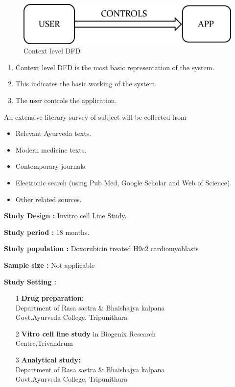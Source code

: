 \documentclass[11pt]{report} %
\begin{document}
\begin{figure}[h]
	\centering
	\includegraphics[width=0.5\linewidth]{figures/context_level_DFD.png}
	\caption{Context level DFD}
	\label{fig:Context level DFD}
\end{figure}


\begin{enumerate}
	\item Context level DFD is the most basic representation of the system.
	\item This indicates the basic working of the system.
	\item The user controls the application.
\end{enumerate}


An extensive literary survey of subject will be collected from 

\begin{itemize}
	\item Relevant Ayurveda texts.
	\item Modern medicine texts.
	\item Contemporary journals.
	\item Electronic search (using Pub Med, Google Scholar and Web of Science).
	\item Other related sources.
\end{itemize}



\textbf{Study Design :} Invitro cell Line Study.

\textbf{Study period :}  18 months.

\textbf{Study population :} Doxorubicin treated H9c2 cardiomyoblasts

\textbf{Sample size :} Not applicable

\textbf{Study Setting : } 

\begin{itemize}
	\item[1] \textbf{Drug preparation:}\\
	Department of Rasa sastra \&  Bhaishajya kalpana   \\           	             Govt.Ayurveda College, Tripunithura
	\item[2] \textbf{Vitro cell line study} in Biogenix Research \\
	Centre,Trivandrum
	\item[3] \textbf{Analytical study:}\\
	Department of Rasa sastra \& Bhaishajya kalpana \\
	Govt.Ayurveda College, Tripunithura
\end{itemize}
\end{document}
